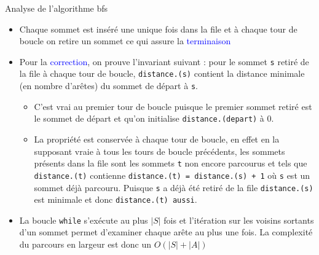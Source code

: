 \documentclass[10pt]{beamer}
\begin{document}
\begin{frame}[fragile]{\Ctitle}{\stitle}
	\begin{block}{Analyse de l'algorithme {\sc bfs}}
		\begin{itemize}
			\item<2-> Chaque sommet est inséré une unique fois dans la file et à chaque tour de boucle on retire un sommet ce qui assure la \textcolor{blue}{terminaison}
			\item<3-> Pour la \textcolor{blue}{correction}, on prouve l'invariant suivant : pour le sommet {\tt s} retiré de la file à chaque tour de boucle, \texttt{distance.(s)} contient la distance minimale (en nombre d'arêtes) du sommet de départ à {\tt s}.
				\begin{itemize}
					\item<4-> C'est vrai au premier tour de boucle puisque le premier sommet retiré est le sommet de départ et qu'on initialise {\tt distance.(depart)} à 0.
					\item<5-> La propriété est conservée à chaque tour de boucle, en effet en la supposant vraie à tous les tours de boucle précédents, les sommets présents dans la file sont les sommets {\tt t}  non encore parcourus et tels que {\tt distance.(t)} contienne {\tt distance.(t) = distance.(s) + 1} où {\tt s} est un sommet déjà parcouru. Puisque {\tt s} a déjà été retiré de la file {\tt distance.(s)} est minimale et donc {\tt distance.(t) aussi}.
				\end{itemize}
			\item<6-> La boucle {\tt while} s'exécute au plus $|S|$ fois et l'itération sur les voisins sortants d'un sommet permet d'examiner chaque arête au plus une fois. La complexité du parcours en largeur est donc un $O(|S|+|A|)$
		\end{itemize}
	\end{block}
\end{frame}
\end{document}
